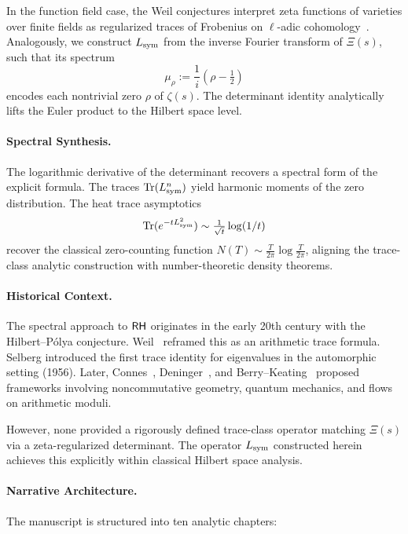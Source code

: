 In the function field case, the Weil conjectures interpret zeta functions of varieties over finite fields as regularized traces of Frobenius on \(\ell\)-adic cohomology~\cite{Deligne1971WeilI}. Analogously, we construct \( L_{\mathrm{sym}} \) from the inverse Fourier transform of \( \Xi(s) \), such that its spectrum
\[
\mu_\rho := \frac{1}{i}(\rho - \tfrac{1}{2})
\]
encodes each nontrivial zero \( \rho \) of \( \zeta(s) \). The determinant identity analytically lifts the Euler product to the Hilbert space level.

\paragraph*{Spectral Synthesis.}
The logarithmic derivative of the determinant recovers a spectral form of the explicit formula. The traces \( \operatorname{Tr}(L_{\mathrm{sym}}^n) \) yield harmonic moments of the zero distribution. The heat trace asymptotics
\[
\operatorname{Tr}(e^{-t L_{\mathrm{sym}}^2}) \sim \tfrac{1}{\sqrt{t}} \log(1/t)
\]
recover the classical zero-counting function \( N(T) \sim \tfrac{T}{2\pi} \log \tfrac{T}{2\pi} \), aligning the trace-class analytic construction with number-theoretic density theorems.

\paragraph*{Historical Context.}
The spectral approach to \(\mathsf{RH}\) originates in the early 20th century with the Hilbert–Pólya conjecture. Weil~\cite{Weil1952Explicite} reframed this as an arithmetic trace formula. Selberg introduced the first trace identity for eigenvalues in the automorphic setting (1956). Later, Connes~\cite{Connes1999TraceFormula}, Deninger~\cite{Deninger1998Frobenius}, and Berry–Keating~\cite{Berry1986RiemannSpectra} proposed frameworks involving noncommutative geometry, quantum mechanics, and flows on arithmetic moduli.

However, none provided a rigorously defined trace-class operator matching \( \Xi(s) \) via a zeta-regularized determinant. The operator \( L_{\mathrm{sym}} \) constructed herein achieves this explicitly within classical Hilbert space analysis.

\paragraph*{Narrative Architecture.}
The manuscript is structured into ten analytic chapters:


